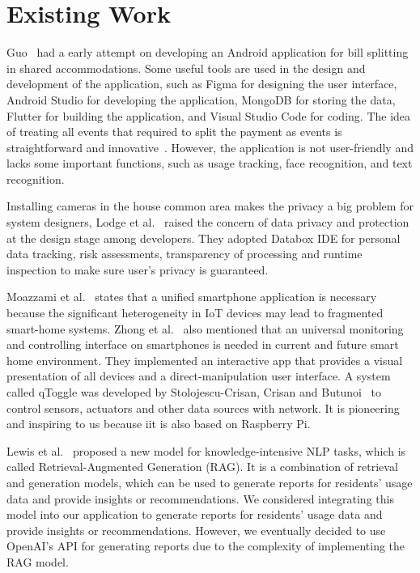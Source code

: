 \documentclass[sigconf,nonacm]{acmart}\settopmatter{printfolios=true}
\begin{document}
\section{Existing Work}
Guo~\cite{DBLP:journals/corr/abs-2104-06823} had a early attempt on developing an Android application for bill splitting in shared accommodations. Some useful tools are used in the design and development of the application, such as Figma for designing the user interface, Android Studio for developing the application, MongoDB for storing the data, Flutter for building the application, and Visual Studio Code for coding. The idea of treating all events that required to split the payment as events is straightforward and innovative~\cite{DBLP:journals/corr/abs-2104-06823}. However, the application is not user-friendly and lacks some important functions, such as usage tracking, face recognition, and text recognition.

Installing cameras in the house common area makes the privacy a big problem for system designers, Lodge et al.~\cite{10.1145/3267305.3274151} raised the concern of data privacy and protection at the design stage among developers. They adopted Databox IDE for personal data tracking, risk assessments, transparency of processing and runtime inspection to make sure user’s privacy is guaranteed.

Moazzami et al.~\cite{10.1145/2968219.2968345} states that a unified smartphone application is necessary because the significant heterogeneity in IoT devices may lead to fragmented smart-home systems. Zhong et al.~\cite{Zhong2011SmartHO} also mentioned that an universal monitoring and controlling interface on smartphones is needed in current and future smart home environment. They implemented an interactive app that provides a visual presentation of all devices and a direct-manipulation user interface. A system called qToggle was developed by Stolojescu-Crisan, Crisan and Butunoi~\cite{s21113784} to control sensors, actuators and other data sources with network. It is pioneering and inspiring to us because iit is also based on Raspberry Pi.

Lewis et al.~\cite{lewis2021retrievalaugmentedgenerationknowledgeintensivenlp} proposed a new model for knowledge-intensive NLP tasks, which is called Retrieval-Augmented Generation (RAG). It is a combination of retrieval and generation models, which can be used to generate reports for residents' usage data and provide insights or recommendations. We considered integrating this model into our application to generate reports for residents' usage data and provide insights or recommendations. However, we eventually decided to use OpenAI's API for generating reports due to the complexity of implementing the RAG model.
\end{document}

